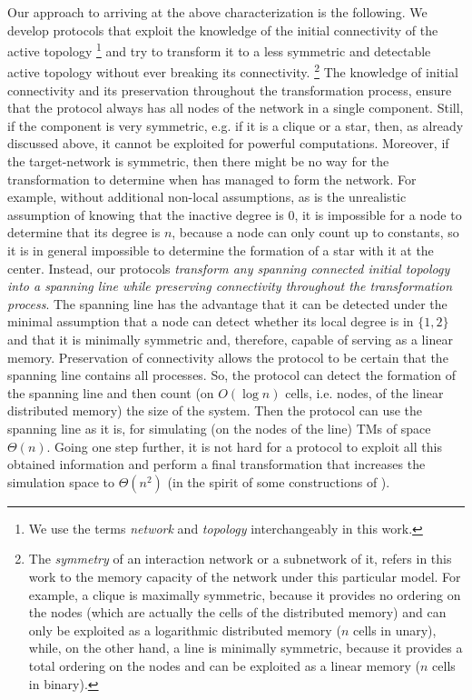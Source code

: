\documentclass[preprint]{elsarticle}
\begin{document}
Our approach to arriving at the above characterization is the following. We develop protocols that exploit the knowledge of the initial connectivity of the active topology \footnote{We use the terms \emph{network} and \emph{topology} interchangeably in this work.} and try to transform it to a less symmetric and detectable active topology without ever breaking its connectivity. \footnote{The \emph{symmetry} of an interaction network or a subnetwork of it, refers in this work to the memory capacity of the network under this particular model. For example, a clique is maximally symmetric, because it provides no ordering on the nodes (which are actually the cells of the distributed memory) and can only be exploited as a logarithmic distributed memory ($n$ cells in unary), while, on the other hand, a line is minimally symmetric, because it provides a total ordering on the nodes and can be exploited as a linear memory ($n$ cells in binary).} The knowledge of initial connectivity and its preservation throughout the transformation process, ensure that the protocol always has all nodes of the network in a single component. Still, if the component is very symmetric, e.g. if it is a clique or a star, then, as already discussed above, it cannot be exploited for powerful computations. Moreover, if the target-network is symmetric, then there might be no way for the transformation to determine when has managed to form the network. For example, without additional non-local assumptions, as is the unrealistic assumption of knowing that the inactive degree is 0, it is impossible for a node to determine that its degree is $n$, because a node can only count up to constants, so it is in general impossible to determine the formation of a star with it at the center. Instead, our protocols \emph{transform any spanning connected initial topology into a spanning line while preserving connectivity throughout the transformation process}. The spanning line has the advantage that it can be detected under the minimal assumption that a node can detect whether its local degree is in $\{1,2\}$ and that it is minimally symmetric and, therefore, capable of serving as a linear memory. Preservation of connectivity allows the protocol to be certain that the spanning line contains all processes. So, the protocol can detect the formation of the spanning line and then count (on $O(\log n)$ cells, i.e. nodes, of the linear distributed memory) the size of the system. Then the protocol can use the spanning line as it is, for simulating (on the nodes of the line) TMs of space $\Theta(n)$. Going one step further, it is not hard for a protocol to exploit all this obtained information and perform a final transformation that increases the simulation space to $\Theta(n^2)$ (in the spirit of some constructions of \cite{MS14}).
\end{document}
